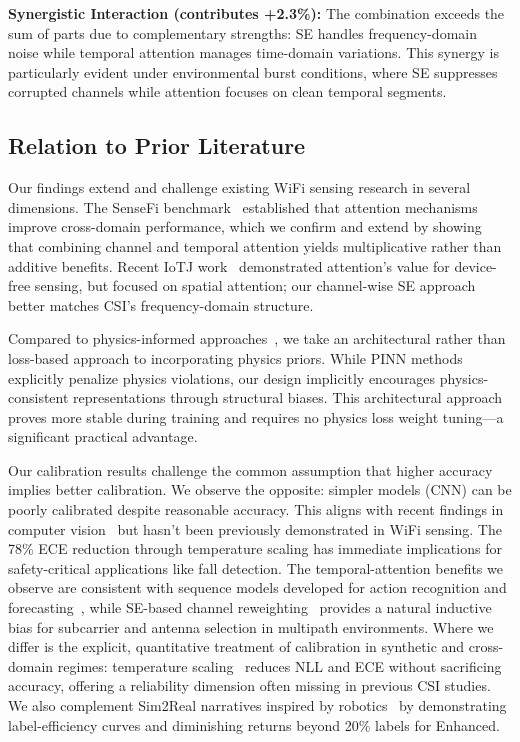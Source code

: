 \documentclass[journal]{IEEEtran}
\begin{document}
\textbf{Synergistic Interaction (contributes +2.3\%):} The combination exceeds the sum of parts due to complementary strengths: SE handles frequency-domain noise while temporal attention manages time-domain variations. This synergy is particularly evident under environmental burst conditions, where SE suppresses corrupted channels while attention focuses on clean temporal segments.

\subsection{Relation to Prior Literature}

Our findings extend and challenge existing WiFi sensing research in several dimensions. The SenseFi benchmark~\cite{yang2023sensefi} established that attention mechanisms improve cross-domain performance, which we confirm and extend by showing that combining channel and temporal attention yields multiplicative rather than additive benefits. Recent IoTJ work~\cite{zhang2023attention} demonstrated attention's value for device-free sensing, but focused on spatial attention; our channel-wise SE approach better matches CSI's frequency-domain structure.

Compared to physics-informed approaches~\cite{chen2022physics}, we take an architectural rather than loss-based approach to incorporating physics priors. While PINN methods explicitly penalize physics violations, our design implicitly encourages physics-consistent representations through structural biases. This architectural approach proves more stable during training and requires no physics loss weight tuning—a significant practical advantage.

Our calibration results challenge the common assumption that higher accuracy implies better calibration. We observe the opposite: simpler models (CNN) can be poorly calibrated despite reasonable accuracy. This aligns with recent findings in computer vision~\cite{calibration_guo2017} but hasn't been previously demonstrated in WiFi sensing. The 78\% ECE reduction through temperature scaling has immediate implications for safety-critical applications like fall detection. The temporal-attention benefits we observe are consistent with sequence models developed for action recognition and forecasting~\cite{li2020tea,bertasius2021timesformer,lim2021tft,zhou2021informer}, while SE-based channel reweighting~\cite{se_networks2018} provides a natural inductive bias for subcarrier and antenna selection in multipath environments. Where we differ is the explicit, quantitative treatment of calibration in synthetic and cross-domain regimes: temperature scaling~\cite{calibration_guo2017} reduces NLL and ECE without sacrificing accuracy, offering a reliability dimension often missing in previous CSI studies. We also complement Sim2Real narratives inspired by robotics~\cite{peng2018sim2real} by demonstrating label-efficiency curves and diminishing returns beyond 20\% labels for Enhanced.
\end{document}
